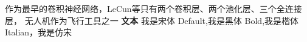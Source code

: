 \documentclass{caasthesis}
\begin{document}
作为最早的卷积神经网络，LeCun等\citeyearpar{lecun2015lenet}只有两个卷积层、两个池化层、三个全连接层，
无人机\citep{高林2016基于无人机数码影像的冬小麦叶面积指数探测研究}作为飞行工具之一
\textbf{文本}
{\songti 我是宋体 Default},{\heiti 我是黑体 Bold},{\kaishu 我是楷体 Italian}，{\fangsong 我是仿宋}


\end{document}
